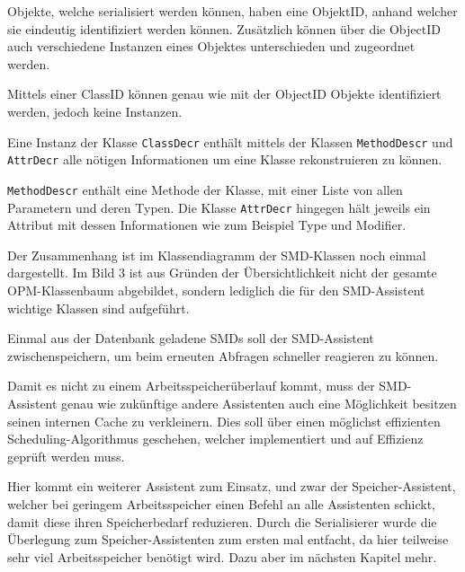 Objekte, welche serialisiert werden k\"onnen, haben eine ObjektID, anhand welcher sie eindeutig identifiziert werden k\"onnen. Zus\"atzlich k\"onnen \"uber die ObjectID auch verschiedene Instanzen eines Objektes unterschieden und zugeordnet werden.

Mittels einer ClassID k\"onnen genau wie mit der ObjectID Objekte identifiziert werden, jedoch keine Instanzen.

Eine Instanz der Klasse \texttt{ClassDecr} enth\"alt mittels der Klassen \texttt{MethodDescr} und \texttt{AttrDecr} alle n\"otigen Informationen um eine Klasse rekonstruieren zu k\"onnen.

\texttt{MethodDescr} enth\"alt eine Methode der Klasse, mit einer Liste von allen Parametern und deren Typen.
Die Klasse \texttt{AttrDecr} hingegen h\"alt jeweils ein Attribut mit dessen Informationen wie zum Beispiel Type und Modifier. \cite{Zil14}

Der Zusammenhang ist im Klassendiagramm der SMD-Klassen noch einmal dargestellt. Im Bild 3 ist aus Gr\"unden der \"Ubersichtlichkeit nicht der gesamte OPM-Klassenbaum abgebildet, sondern lediglich die f\"ur den SMD-Assistent wichtige Klassen sind aufgef\"uhrt.

Einmal aus der Datenbank geladene \ac{SMD}s soll der SMD-Assistent zwischenspeichern, um beim erneuten Abfragen schneller reagieren zu k\"onnen. 

Damit es nicht zu einem Arbeitsspeicher\"uberlauf kommt, muss der SMD-Assistent genau wie zuk\"unftige andere Assistenten auch eine M\"oglichkeit besitzen seinen internen Cache zu verkleinern. Dies soll \"uber einen m\"oglichst effizienten Scheduling-Algorithmus geschehen, welcher implementiert und auf Effizienz gepr\"uft werden muss.

Hier kommt ein weiterer Assistent zum Einsatz, und zwar der Speicher-Assistent, welcher bei geringem Arbeitsspeicher einen Befehl an alle Assistenten schickt, damit diese ihren Speicherbedarf reduzieren. Durch die Serialisierer wurde die \"Uberlegung zum Speicher-Assistenten zum ersten mal entfacht, da hier teilweise sehr viel Arbeitsspeicher ben\"otigt wird. Dazu aber im n\"achsten Kapitel mehr.

